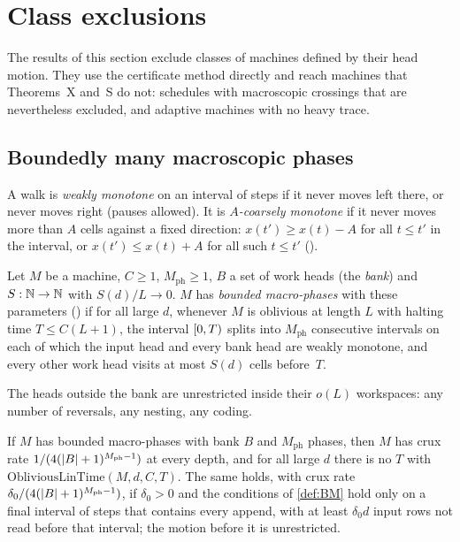 \section{Class exclusions}\label{sec:classes}

The results of this section exclude classes of machines defined by their head motion. They use the certificate method directly and
reach machines that Theorems~X and~S do not: schedules with macroscopic crossings that are nevertheless excluded, and adaptive machines
with no heavy trace.

\subsection{Boundedly many macroscopic phases}

A walk is \emph{weakly monotone} on an interval of steps if it never moves left there, or never moves right (pauses allowed). It is
\emph{$A$-coarsely monotone} if it never moves more than $A$ cells against a fixed direction: $x(t')\ge x(t)-A$ for all $t\le t'$ in the
interval, or $x(t')\le x(t)+A$ for all such $t\le t'$ ().

\begin{definition}\label{def:BM}
Let $M$ be a machine, $C\ge1$, $M_{\mathrm{ph}}\ge1$, $B$ a set of work heads (the \emph{bank}) and $S:\mathbb{N}\to\mathbb{N}$ with $S(d)/L\to0$. $M$ has
\emph{bounded macro-phases} with these parameters () if for all large $d$, whenever $M$ is oblivious at length $L$
with halting time $T\le C(L+1)$, the interval $[0,T)$ splits into $M_{\mathrm{ph}}$ consecutive intervals on each of which the input
head and every bank head are weakly monotone, and every other work head visits at most $S(d)$ cells before~$T$.
\end{definition}

The heads outside the bank are unrestricted inside their $o(L)$ workspaces: any number of reversals, any nesting, any coding.

\begin{theorem}\label{thm:BM}
If $M$ has bounded macro-phases with bank $B$ and $M_{\mathrm{ph}}$ phases, then $M$ has crux rate $1/(4(\lvert B \rvert+1)^{M_{\mathrm{ph}}-1})$ at every
depth, and for all large $d$ there is no $T$ with $\mathrm{ObliviousLinTime}(M,d,C,T)$. The same holds, with crux rate
$\delta_0/(4(\lvert B \rvert+1)^{M_{\mathrm{ph}}-1})$, if $\delta_0>0$ and the conditions of \cref{def:BM} hold only on a final interval of steps that
contains every append, with at least $\delta_0d$ input rows not read before that interval; the motion before it is unrestricted.
\end{theorem}

